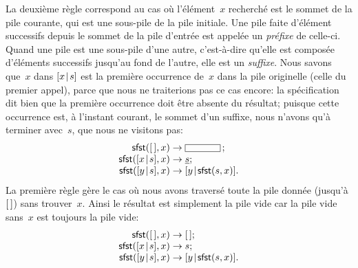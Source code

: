 La deuxième règle correspond au cas où l'élément~\(x\) recherché est
le sommet de la pile courante, qui est une sous-pile de la pile
initiale. Une pile faite d'élément successifs depuis le sommet de la
pile d'entrée est appelée un \emph{préfixe} de celle-ci. Quand une
pile est une sous-pile d'une autre, c'est-à-dire qu'elle est composée
d'éléments successifs jusqu'au fond de l'autre, elle est un
\emph{suffixe}. Nous savons que~\(x\) dans \([{x}\!\mid\!{s}]\) est la
première occurrence de~\(x\) dans la pile originelle (celle du premier
appel), parce que nous ne traiterions pas ce cas encore: la
spécification dit bien que la première occurrence doit être absente du
résultat; puisque cette occurrence est, à l'instant courant, le sommet
d'un suffixe, nous n'avons qu'à terminer avec~\(s\), que nous ne
visitons pas:
\begin{equation*}
\begin{array}{r@{\;}l@{\;}l}
\fun{sfst}(\el,x)         & \rightarrow & \fbcode{CCCCC}\,;\\
\fun{sfst}(\cons{x}{s},x) & \rightarrow & \underline{s};\\
\fun{sfst}(\cons{y}{s},x) & \rightarrow & \cons{y}{\fun{sfst}(s,x)}.
\end{array}
\end{equation*}
La première règle gère le cas où nous avons traversé toute la pile
donnée (jusqu'à \([\,]\)) sans trouver~\(x\). Ainsi le résultat est
simplement la pile vide car la pile vide sans~\(x\) est toujours la
pile vide:
\begin{equation*}
\begin{array}{r@{\;}l@{\;}l}
\fun{sfst}(\el,x)         & \rightarrow & \el;\\
\fun{sfst}(\cons{x}{s},x) & \rightarrow & s;\\
\fun{sfst}(\cons{y}{s},x) & \rightarrow & \cons{y}{\fun{sfst}(s,x)}.
\end{array}
\end{equation*}

